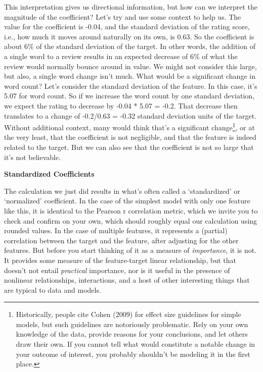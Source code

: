 \documentclass[
  letterpaper,
]{krantz}
\begin{document}
This interpretation gives us directional information, but how can we
interpret the magnitude of the coefficient? Let's try and use some
context to help us. The value for the coefficient is -0.04, and the
standard deviation of the rating score, i.e., how much it moves around
naturally on its own, is 0.63. So the coefficient is about 6\% of the
standard deviation of the target. In other words, the addition of a
single word to a review results in an expected decrease of 6\% of what
the review would normally bounce around in value. We might not consider
this large, but also, a single word change isn't much. What would be a
significant change in word count? Let's consider the standard deviation
of the feature. In this case, it's 5.07 for word count. So if we
increase the word count by one standard deviation, we expect the rating
to decrease by -0.04 * 5.07 = -0.2. That decrease then translates to a
change of -0.2/0.63 = -0.32 standard deviation units of the target.
Without additional context, many would think that's a significant
change\footnote{Historically, people cite Cohen (2009) for effect size
  guidelines for simple models, but such guidelines are notoriously
  problematic. Rely on your own knowledge of the data, provide reasons
  for your conclusions, and let others draw their own. If you cannot
  tell what would constitute a notable change in your outcome of
  interest, you probably shouldn't be modeling it in the first place.},
or at the very least, that the coefficient is not negligible, and that
the feature is indeed related to the target. But we can also see that
the coefficient is not so large that it's not believable.

\begin{tcolorbox}[enhanced jigsaw, bottomrule=.15mm, rightrule=.15mm, colframe=quarto-callout-tip-color-frame, colback=white, breakable, arc=.35mm, left=2mm, opacityback=0, leftrule=.75mm, toprule=.15mm]

\vspace{-3mm}\textbf{Standardized Coefficients}\vspace{3mm}

The calculation we just did results in what's often called a
`standardized' or `normalized' coefficient. In the case of the simplest
model with only one feature like this, it is identical to the Pearson r
correlation metric, which we invite you to check and confirm on your
own, which should roughly equal our calculation using rounded values. In
the case of multiple features, it represents a (partial) correlation
between the target and the feature, after adjusting for the other
features. But before you start thinking of it as a measure of
\emph{importance}, it is not. It provides some measure of the
feature-target linear relationship, but that doesn't not entail
\emph{practical} importance, nor is it useful in the presence of
nonlinear relationships, interactions, and a host of other interesting
things that are typical to data and models.

\end{tcolorbox}
\end{document}
